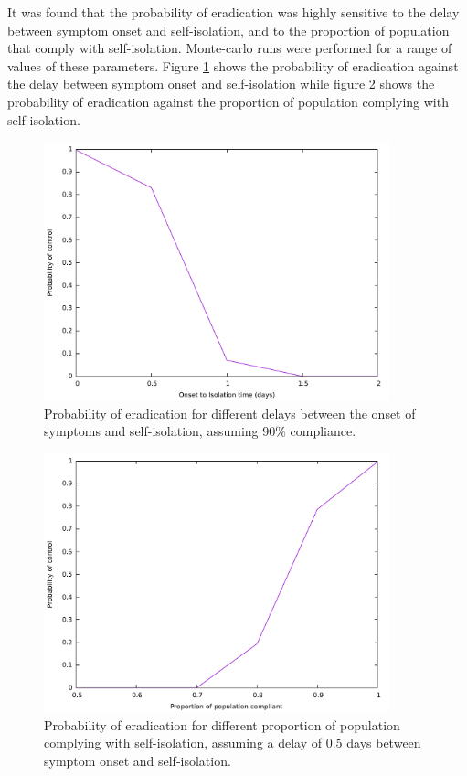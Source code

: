 \documentclass{article}
\begin{document}
It was found that the probability of eradication was highly sensitive to the delay between symptom onset and self-isolation, and to the proportion of population that comply with self-isolation. Monte-carlo runs were performed for a range of values of these parameters. Figure \ref{onsetToIsolation} shows the probability of eradication against the delay between symptom onset and self-isolation while figure \ref{compliance} shows the probability of eradication against the proportion of population complying with self-isolation.

\begin{figure}
\begin{center}
\includegraphics[width = 10cm]{onsetToIsolation3.pdf}
\end{center}
\caption{Probability of eradication for different delays between the onset of symptoms and self-isolation, assuming 90\% compliance.}
\label{onsetToIsolation}
\end{figure}

\begin{figure}
\begin{center}
\includegraphics[width = 10cm]{compliance.pdf}
\end{center}
\caption{Probability of eradication for different proportion of population complying with self-isolation, assuming a delay of 0.5 days between symptom onset and self-isolation.}
\label{compliance}
\end{figure}
\end{document}
